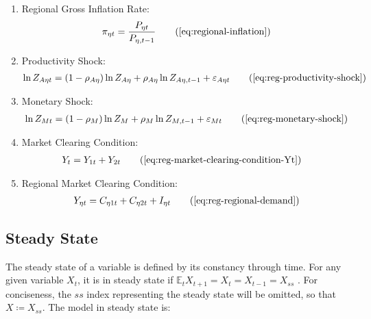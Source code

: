 \documentclass[../thesis.tex]{subfiles}
\begin{document}
{\begin{itemize}
\begin{enumerate}
		\item Regional Gross Inflation Rate:
		\begin{align}
			\pi_{\eta t} = \frac{P_{\eta t}}{P_{\eta, t-1}} \tag{\ref{eq:regional-inflation}}
		\end{align}
		
		\item Productivity Shock:
		\begin{align}
			\ln{Z_{A\eta t}} = (1-\rho_{A\eta})\ln{Z_{A\eta}} + \rho_{A\eta}\ln{Z_{A\eta,t-1}} + \varepsilon_{A\eta t} \tag{\ref{eq:reg-productivity-shock}}
		\end{align}
		
		\item Monetary Shock:
		\begin{align}
			\ln{Z_{Mt}} = (1-\rho_M)\ln{Z_{M}} + \rho_M\ln{Z_{M,t-1}} + \varepsilon_{Mt} \tag{\ref{eq:reg-monetary-shock}}
		\end{align}

		\item Market Clearing Condition:
		\begin{align}
			Y_{t} &= Y_{1 t} + Y_{2 t} \tag{\ref{eq:reg-market-clearing-condition-Yt}}
		\end{align}

		\begin{comment}
	
		\end{comment}
		
		\item Regional Market Clearing Condition:
		\begin{align}
			Y_{\eta t} = C_{\eta 1 t} + C_{\eta 2 t} + I_{\eta t} \tag{\ref{eq:reg-regional-demand}}
		\end{align}
			
		\end{enumerate}
		
	\end{itemize}
	
} %



\subsection{Steady State}

The steady state of a variable is defined by its constancy through time. For any given variable $X_t$, it is in steady state if $\mathbb{E}_t X_{t+1} = X_t = X_{t-1} = X_{ss}$ \cite[p.41]{costa_junior_understanding_2016}. For conciseness, the $ss$ index representing the steady state will be omitted, so that $X \coloneq X_{ss}$. The model in steady state is:
\end{document}
